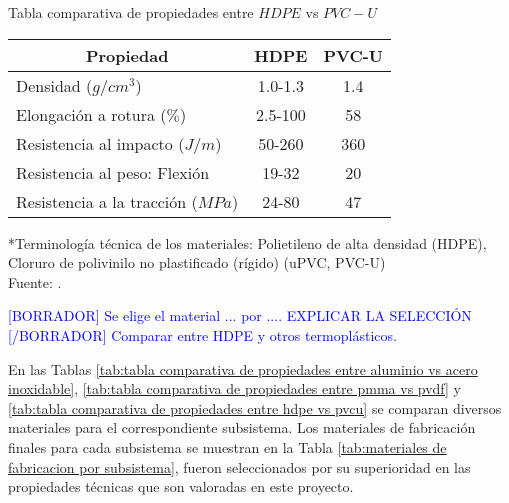 \begin{itemize}
	\begin{mytable}[H]
		\centering
		\caption{Tabla comparativa de propiedades entre $HDPE$ vs $PVC-U$}
		\label{tab:tabla comparativa de propiedades entre hdpe vs pvcu}
		\begin{tabular}{|l|c|c|}
			\hline
			\multicolumn{1}{|c|}{\textbf{Propiedad}} & \textbf{HDPE} & \textbf{PVC-U} \\ \hline
			Densidad ($g/cm^3$) & 1.0-1.3 & 1.4 \\ \hline
			Elongación a rotura ($\%$) & 2.5-100 & 58 \\ \hline
			Resistencia al impacto ($J/m$) & 50-260 & 360 \\ \hline
			Resistencia al peso: Flexión & 19-32 & 20 \\ \hline
			Resistencia a la tracción ($MPa$) & 24-80 & 47 \\ \hline
		\end{tabular}
		\begin{flushleft}
			*Terminología técnica de los materiales: Polietileno de alta densidad (HDPE), Cloruro de polivinilo no plastificado (rígido) (uPVC, PVC-U)\\		
			Fuente: \cite{Brydson1999,Berins1991,Harper2000,MakeItFrom2020}.
		\end{flushleft}
	\end{mytable}
	
	\textcolor{blue}{[BORRADOR] Se elige el material ... por .... EXPLICAR LA SELECCIÓN [/BORRADOR] Comparar entre HDPE y otros termoplásticos.} 
	
\end{itemize}

En las Tablas \ref{tab:tabla comparativa de propiedades entre aluminio vs acero inoxidable}, \ref{tab:tabla comparativa de propiedades entre pmma vs pvdf} y \ref{tab:tabla comparativa de propiedades entre hdpe vs pvcu} se comparan diversos materiales para el correspondiente subsistema. Los materiales de fabricación finales para cada subsistema se muestran en la Tabla \ref{tab:materiales de fabricacion por subsistema}, fueron seleccionados por su superioridad en las propiedades técnicas que son valoradas en este proyecto. 

